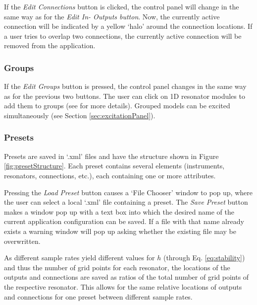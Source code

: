 \documentclass{article}
\begin{document}
If the \textit{Edit Connections} button is clicked, the control panel will change in the same way as for the \textit{Edit In- Outputs button}. Now, the currently active connection will be indicated by a yellow `halo' around the connection locations. If a user tries to overlap two connections, the currently active connection will be removed from the application.

\subsubsection{Groups}
If the \textit{Edit Groups} button is pressed, the control panel changes in the same way as for the previous two buttons.  The user can click on 1D resonator modules to add them to groups (see \cite{demo} for more details). Grouped models can be excited simultaneously (see Section \ref{sec:excitationPanel}).


\subsubsection{Presets}\label{sec:presets}
Presets are saved in `.xml' files and have the structure shown in Figure \ref{fig:presetStructure}. Each preset contains several elements (instruments, resonators, connections, etc.), each containing one or more attributes. 

Pressing the \textit{Load Preset} button causes a `File Chooser' window to pop up, where the user can select a local `.xml' file containing a preset. The \textit{Save Preset} button makes a window pop up with a text box into which the desired name of the current application configuration can be saved. If a file with that name already exists a warning window will pop up asking whether the existing file may be overwritten.

As different sample rates yield different values for $h$ (through Eq. \eqref{eq:stability}) and thus the number of grid points for each resonator, the locations of the outputs and connections are saved as ratios of the total number of grid points of the respective resonator. This allows for the same relative locations of outputs and connections for one preset between different sample rates.
\end{document}
